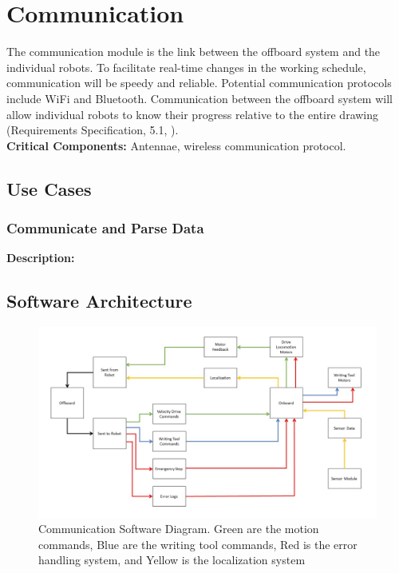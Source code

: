 
\section{Communication}
\label{sec:communication}
The communication module is the link between the offboard system and the individual robots. To facilitate real-time changes in the working schedule, communication will be speedy and reliable. Potential communication protocols include WiFi and Bluetooth. Communication between the offboard system will allow individual robots to know their progress relative to the entire drawing (Requirements Specification, 5.1, ). \\

\noindent
\textbf{Critical Components:} Antennae, wireless communication protocol.

\subsection{Use Cases}
\subsubsection{Communicate and Parse Data}
\textbf{Description:} 


\subsection{Software Architecture}
\label{sec:sw_arch_communication}

\begin{figure}[h!]
 \centering
  \includegraphics[width=0.99\columnwidth]{diagrams/sw_arch_communication.jpg}
	\caption{Communication Software Diagram. Green are the motion commands, Blue are the writing tool commands, Red is the error handling system, and Yellow is the localization system}
 \label{fig:comm_processing}
\end{figure}

